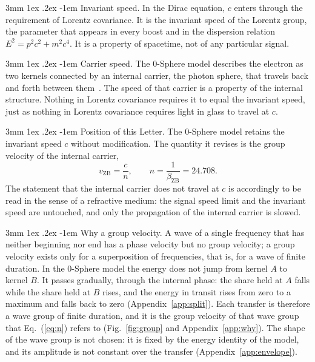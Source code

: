 \documentclass[%
 reprint, amsmath,amssymb, aps, prb, ]{revtex4-2}
\makeatletter
\numberwithin{equation}{section}
\renewcommand\paragraph{%
  \@startsection{paragraph}{4}{\z@}%
    {3mm \@plus 1ex \@minus .2ex}%
    {-1em}%
    {\normalfont\normalsize\itshape}}
\makeatother
\begin{document}
\paragraph{Invariant speed.} In the Dirac equation, $c$ enters through the requirement of Lorentz covariance. It is the invariant speed of the Lorentz group, the parameter that appears in every boost and in the dispersion relation $E^2 = p^2c^2 + m^2c^4$. It is a property of spacetime, not of any particular signal.

\paragraph{Carrier speed.} The 0-Sphere model describes the electron as two kernels connected by an internal carrier, the photon sphere, that travels back and forth between them~\cite{H33,H51}. The speed of that carrier is a property of the internal structure. Nothing in Lorentz covariance requires it to equal the invariant speed, just as nothing in Lorentz covariance requires light in glass to travel at $c$.

\paragraph{Position of this Letter.} The 0-Sphere model retains the invariant speed $c$ without modification. The quantity it revises is the group velocity of the internal carrier,
\begin{equation}
v_{\text{ZB}} = \frac{c}{n}, \qquad n = \frac{1}{\beta_{\text{ZB}}} = 24.708.
\label{eq:n}
\end{equation}
The statement that the internal carrier does not travel at $c$ is accordingly to be read in the sense of a refractive medium: the signal speed limit and the invariant speed are untouched, and only the propagation of the internal carrier is slowed.

\paragraph{Why a group velocity.} A wave of a single frequency that has neither beginning nor end has a phase velocity but no group velocity; a group velocity exists only for a superposition of frequencies, that is, for a wave of finite duration. In the 0-Sphere model the energy does not jump from kernel $A$ to kernel $B$. It passes gradually, through the internal phase: the share held at $A$ falls while the share held at $B$ rises, and the energy in transit rises from zero to a maximum and falls back to zero (Appendix~\ref{app:split}). Each transfer is therefore a wave group of finite duration, and it is the group velocity of that wave group that Eq.~(\ref{eq:n}) refers to (Fig.~\ref{fig:group} and Appendix~\ref{app:why}). The shape of the wave group is not chosen: it is fixed by the energy identity of the model, and its amplitude is not constant over the transfer (Appendix~\ref{app:envelope}).
\end{document}
